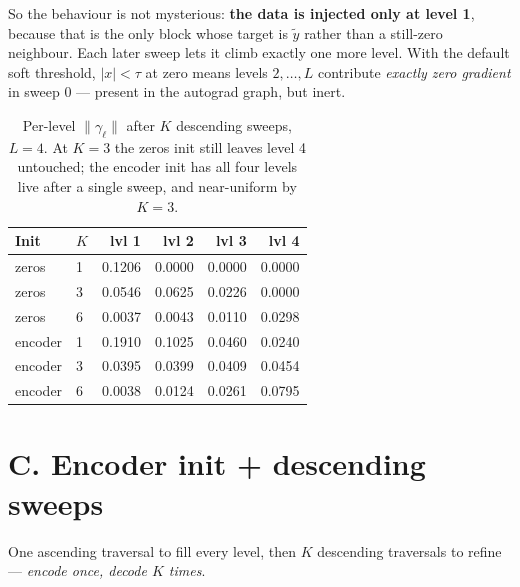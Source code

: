 \documentclass[11pt]{article}
\begin{document}
So the behaviour is not mysterious: \textbf{the data is injected only at level 1}, because that is the only
block whose target is $\tilde y$ rather than a still-zero neighbour. Each later sweep lets it climb exactly
one more level. With the default soft threshold, $|x| < \tau$ at zero means levels $2,\dots,L$ contribute
\emph{exactly zero gradient} in sweep 0 --- present in the autograd graph, but inert.

\begin{table}[h]\centering\small
\begin{tabular}{llrrrr}
\toprule
Init & $K$ & lvl 1 & lvl 2 & lvl 3 & lvl 4 \\
\midrule
zeros   & 1 & 0.1206 & \textcolor{flag}{0.0000} & \textcolor{flag}{0.0000} & \textcolor{flag}{0.0000} \\
zeros   & 3 & 0.0546 & 0.0625 & 0.0226 & \textcolor{flag}{0.0000} \\
zeros   & 6 & 0.0037 & 0.0043 & 0.0110 & 0.0298 \\
\midrule
encoder & 1 & 0.1910 & 0.1025 & 0.0460 & 0.0240 \\
encoder & 3 & 0.0395 & 0.0399 & 0.0409 & 0.0454 \\
encoder & 6 & 0.0038 & 0.0124 & 0.0261 & 0.0795 \\
\bottomrule
\end{tabular}
\caption*{\footnotesize Per-level $\|\gamma_\ell\|$ after $K$ descending sweeps, $L=4$. At $K=3$ the zeros
init still leaves level 4 untouched; the encoder init has all four levels live after a single sweep, and
near-uniform by $K=3$.}
\end{table}


\section*{C. Encoder init + descending sweeps}

One ascending traversal to fill every level, then $K$ descending traversals to refine --- \emph{encode once,
decode $K$ times}.
\end{document}
